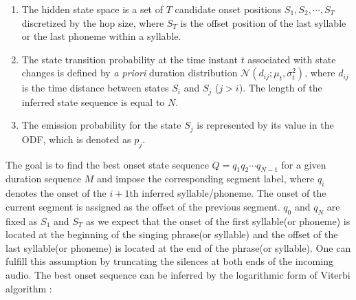 \begin{enumerate}[leftmargin=*]
    \item The hidden state space is a set of $T$ candidate onset positions $S_1, S_2, \cdots, S_T$ discretized by the hop size, where $S_{T}$ is the offset position of the last syllable or the last phoneme within a syllable.
    \item The state transition probability at the time instant $t$ associated with state changes is defined by \textit{a priori} duration distribution $\mathcal{N} (d_{ij} ; \mu_t, \sigma_t^2)$, where $d_{ij}$ is the time distance between states $S_i$ and $S_j$ ($j>i$). The length of the inferred state sequence is equal to $N$.
    \item The emission probability for the state $S_j$ is represented by its value in the ODF, which is denoted as $p_j$.
\end{enumerate} 

The goal is to find the best onset state sequence $Q={q_1 q_2 \cdots q_{N-1}}$ for a given duration sequence $M$ and impose the corresponding segment label, where $q_i$ denotes the onset of the $i+1$th inferred syllable/phoneme. The onset of the current segment is assigned as the offset of the previous segment. $q_0$ and $q_N$ are fixed as $S_1$ and $S_T$ as we expect that the onset of the first syllable(or phoneme) is located at the beginning of the singing phrase(or syllable) and the offset of the last syllable(or phoneme) is located at the end of the phrase(or syllable). One can fulfill this assumption by truncating the silences at both ends of the incoming audio. The best onset sequence can be inferred by the logarithmic form of Viterbi algorithm \cite{rabiner1989tutorial}:

